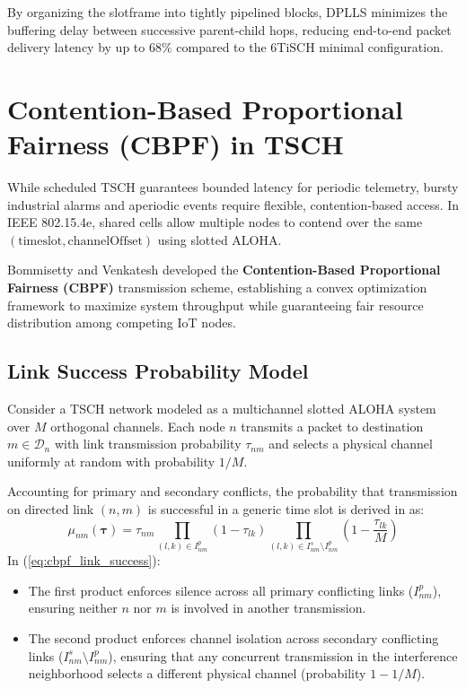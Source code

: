 By organizing the slotframe into tightly pipelined blocks, DPLLS minimizes the buffering delay between successive parent-child hops, reducing end-to-end packet delivery latency by up to $68\%$ compared to the 6TiSCH minimal configuration.

\section{Contention-Based Proportional Fairness (CBPF) in TSCH}
\label{sec:cbpf}

While scheduled TSCH guarantees bounded latency for periodic telemetry, bursty industrial alarms and aperiodic events require flexible, contention-based access. In IEEE 802.15.4e, shared cells allow multiple nodes to contend over the same $(\text{timeslot}, \text{channelOffset})$ using slotted ALOHA.

Bommisetty and Venkatesh \cite{bommisetty2023cbpf} developed the \textbf{Contention-Based Proportional Fairness (CBPF)} transmission scheme, establishing a convex optimization framework to maximize system throughput while guaranteeing fair resource distribution among competing IoT nodes.

\subsection{Link Success Probability Model}
Consider a TSCH network modeled as a multichannel slotted ALOHA system over $M$ orthogonal channels. Each node $n$ transmits a packet to destination $m \in \mathcal{D}_n$ with link transmission probability $\tau_{nm}$ and selects a physical channel uniformly at random with probability $1/M$.

Accounting for primary and secondary conflicts, the probability that transmission on directed link $(n, m)$ is successful in a generic time slot is derived in \cite{bommisetty2023cbpf} as:
\begin{equation}
    \label{eq:cbpf_link_success}
    \mu_{nm}(\boldsymbol{\tau}) = \tau_{nm} \prod_{(l, k) \in I_{nm}^p} (1 - \tau_{lk}) \prod_{(l, k) \in I_{nm}^s \setminus I_{nm}^p} \left( 1 - \frac{\tau_{lk}}{M} \right)
\end{equation}
In (\ref{eq:cbpf_link_success}):
\begin{itemize}
    \item The first product enforces silence across all primary conflicting links ($I_{nm}^p$), ensuring neither $n$ nor $m$ is involved in another transmission.
    \item The second product enforces channel isolation across secondary conflicting links ($I_{nm}^s \setminus I_{nm}^p$), ensuring that any concurrent transmission in the interference neighborhood selects a different physical channel (probability $1 - 1/M$).
\end{itemize}

